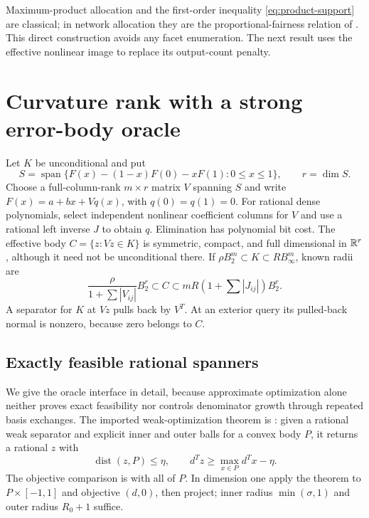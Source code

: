 Maximum-product allocation and the first-order inequality
\eqref{eq:product-support} are classical; in network allocation they
are the proportional-fairness relation of \citet[Section 2]{kelly1998}.
This direct construction avoids any facet enumeration. The next result
uses the effective nonlinear image to replace its output-count penalty.

\section{Curvature rank with a strong error-body oracle}\label{sec:vector-oracle}

Let $K$ be unconditional and put
\begin{equation}\label{eq:nonlinear-output-image}
 S=\operatorname{span}\{F(x)-(1-x)F(0)-xF(1):0\le x\le1\},
 \qquad r=\dim S.
\end{equation}
Choose a full-column-rank $m\times r$ matrix $V$ spanning $S$ and write
$F(x)=a+bx+Vq(x)$, with $q(0)=q(1)=0$.
For rational dense polynomials, select independent nonlinear coefficient
columns for $V$ and use a rational left inverse $J$ to obtain $q$.
Elimination has polynomial bit cost. The effective body
$C=\{z:Vz\in K\}$ is symmetric, compact, and full dimensional in
$\mathbb R^r$, although it need not be unconditional there.
If $\rho B_2^m\subset K\subset R B_\infty^m$, known radii are
\begin{equation}\label{eq:effective-body-radii}
 \frac{\rho}{1+\sum|V_{ij}|}B_2^r\subset C
 \subset mR(1+\sum|J_{ij}|)B_2^r.
\end{equation}
A separator for $K$ at $Vz$ pulls back by $V^T$. At an exterior query
its pulled-back normal is nonzero, because zero belongs to $C$.

\subsection{Exactly feasible rational spanners}

We give the oracle interface in detail, because approximate optimization
alone neither proves exact feasibility nor controls denominator growth
through repeated basis exchanges. The imported weak-optimization theorem
is \citet[Definition (5), Theorem (3.1)]{gls1981}: given a rational weak
separator and explicit inner and outer balls for a convex body $P$, it
returns a rational $z$ with
\begin{equation}\label{eq:weak-opt-spanner}
 \operatorname{dist}(z,P)\le\eta,
 \qquad d^Tz\ge\max_{x\in P}d^Tx-\eta.
\end{equation}
The objective comparison is with all of $P$. In dimension one apply the
theorem to $P\times[-1,1]$ and objective $(d,0)$, then project; inner
radius $\min(\sigma,1)$ and outer radius $R_0+1$ suffice.

